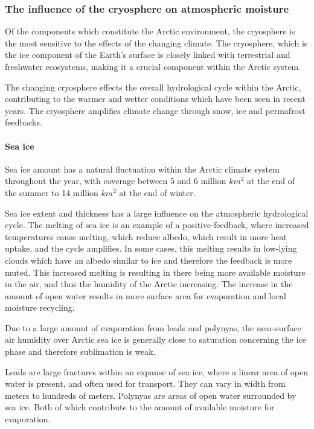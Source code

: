 \documentclass[12pt, oneside]{article}
\begin{document}
\subsubsection{The influence of the cryosphere on atmospheric moisture}
Of the components which constitute the Arctic environment, the cryosphere is the most sensitive to the effects of the changing climate\cite{rinke2019trends}. The cryosphere, which is the ice component of the Earth's surface is closely linked with terrestrial and freshwater ecosystems, making it a crucial component within the Arctic system.

The changing cryosphere effects the overall hydrological cycle within the Arctic, contributing to the warmer and wetter conditions which have been seen in recent years. The cryosphere amplifies climate change through snow, ice and permafrost feedbacks. 

\paragraph{Sea ice}
Sea ice amount has a natural fluctuation within the Arctic climate system throughout the year, with coverage between 5 and 6 million $km^2$ at the end of the summer to 14 million $km^2$ at the end of winter. 

Sea ice extent and thickness has a large influence on the atmospheric hydrological cycle. The melting of sea ice is an example of a positive-feedback, where increased temperatures cause melting, which reduce albedo, which result in more heat uptake, and the cycle amplifies. In some cases, this melting results in low-lying clouds which have an albedo similar to ice and therefore the feedback is more muted. This increased melting is resulting in there being more available moisture in the air, and thus the humidity of the Arctic increasing. The increase in the amount of open water results in more surface area for evaporation and local moisture recycling. 

 Due to a large amount of evaporation from leads and polynyas, the near-surface air humidity over Arctic sea ice is generally close to saturation concerning the ice phase and therefore sublimation is weak\cite{andreas2002near}. 
 
 Leads are large fractures within an expanse of sea ice, where a linear area of open water is present, and often used for transport. They can vary in width from meters to hundreds of meters. Polynyas are areas of open water surrounded by sea ice. Both of which contribute to the amount of available moisture for evaporation.
\end{document}
